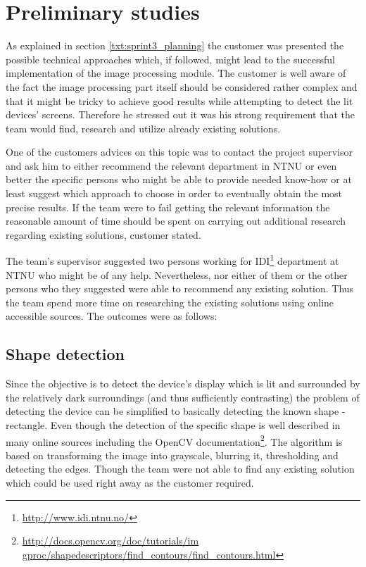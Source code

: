 \section{Preliminary studies}
As explained in section \ref{txt:sprint3_planning} the customer was presented the possible technical approaches which, if followed, might lead to the successful implementation of the image processing module. The customer is well aware of the fact the image processing part itself should be considered rather complex and that it might be tricky to achieve good results while attempting to detect the lit devices' screens. Therefore he stressed out it was his strong requirement that the team would find, research and utilize already existing solutions.

One of the customers advices on this topic was to contact the project supervisor and ask him to either recommend the relevant department in NTNU or even better the specific persons who might be able to provide needed know-how or at least suggest which approach to choose in order to eventually obtain the most precise results. If the team were to fail getting the relevant information the reasonable amount of time should be spent on carrying out additional research regarding existing solutions, customer stated.

The team's supervisor suggested two persons working for IDI\footnote{\url{http://www.idi.ntnu.no/}} department at NTNU who might be of any help. Nevertheless, nor either of them or the other persons who they suggested were able to recommend any existing solution. Thus the team spend more time on researching the existing solutions using online accessible sources. The outcomes were as follows:

\subsection{Shape detection}
Since the objective is to detect the device's display which is lit and surrounded by the relatively dark surroundings (and thus sufficiently contrasting) the problem of detecting the device can be simplified to basically detecting the known shape - rectangle. Even though the detection of the specific shape is well described in many online sources including the OpenCV documentation\footnote{\url{http://docs.opencv.org/doc/tutorials/im
gproc/shapedescriptors/find_contours/find_contours.html}}. The algorithm is based on transforming the image into grayscale, blurring it, thresholding and detecting the edges. Though the team were not able to find any existing solution which could be used right away as the customer required.

